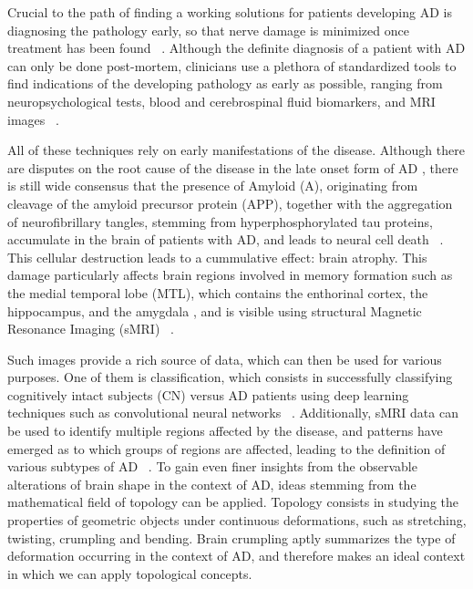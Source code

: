 \documentclass{article}
\begin{document}
Crucial to the path of finding a working solutions for patients developing AD is diagnosing the pathology early, so that nerve damage is minimized once treatment has been found ~\citep{yiannopoulou2020current}. Although the definite diagnosis of a patient with AD can only be done post-mortem, clinicians use a plethora of standardized tools to find indications of the developing pathology as early as possible, ranging from neuropsychological tests, blood and cerebrospinal fluid biomarkers, and MRI images ~\citep{mckhann2011diagnosis, lehmann2016biomarkers, smits2012early}.

All of these techniques rely on early manifestations of the disease. Although there are disputes on the root cause of the disease in the late onset form of AD \citep{hur2020innate, fulop2018can, tharp2013origins}, there is still wide consensus that the presence of Amyloid \textbeta{} (A\textbeta{}), originating from cleavage of the amyloid precursor protein (APP), together with the aggregation of neurofibrillary tangles, stemming from hyperphosphorylated tau proteins, accumulate in the brain of patients with AD, and leads to neural cell death ~\citep{da2016insights}. This cellular destruction leads to a cummulative effect: brain atrophy. This damage particularly affects brain regions involved in memory formation such as the medial temporal lobe (MTL), which contains the enthorinal cortex, the hippocampus, and the amygdala \citep{goedert2006century}, and is visible using structural Magnetic Resonance Imaging (sMRI) ~\citep{frisoni2010clinical}.

Such images provide a rich source of data, which can then be used for various purposes. One of them is classification, which consists in successfully classifying cognitively intact subjects (CN) versus AD patients using deep learning techniques such as convolutional neural networks ~\citep{wen2020convolutional}. Additionally, sMRI data can be used to identify multiple regions affected by the disease, and patterns have emerged as to which groups of regions are affected, leading to the definition of various subtypes of AD ~\citep{poulakis2018heterogeneous}. To gain even finer insights from the observable alterations of brain shape in the context of AD, ideas stemming from the mathematical field of topology can be applied. Topology consists in studying the properties of geometric objects under continuous deformations, such as stretching, twisting, crumpling and bending. Brain crumpling aptly summarizes the type of deformation occurring in the context of AD, and therefore makes an ideal context in which we can apply topological concepts.
\end{document}
